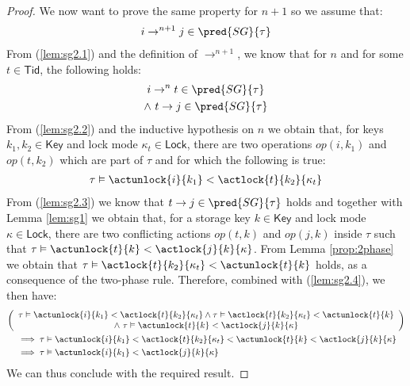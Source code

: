 \begin{lem}
{\begin{proof}
	We now want to prove the same property for $n + 1$ so we assume that:
	\begin{gather}
		\label{lem:sg2.1}
		i \rightarrow^{n+1} j \in \pred{SG}{\tau}
	\end{gather}
	From (\ref{lem:sg2.1}) and the definition of $\rightarrow^{n+1}$, we know that for $n$ and for some $t \in \mathsf{Tid}$, the following holds:
	\begin{gather}
		\label{lem:sg2.2}
		i \rightarrow^n t \in \pred{SG}{\tau} \\
		\label{lem:sg2.3}
		\land\ t \rightarrow j \in \pred{SG}{\tau}
	\end{gather}
	From (\ref{lem:sg2.2}) and the inductive hypothesis on $n$ we obtain that, for keys $k_1, k_2 \in \mathsf{Key}$ and lock mode $\kappa_t \in \mathsf{Lock}$, there are two operations $op(i, k_1)$ and $op(t, k_2)$ which are part of $\tau$ and for which the following is true:
	\begin{gather}
		\label{lem:sg2.4}
		\tau \vDash \actunlock{i}{k_1} < \actlock{t}{k_2}{\kappa_t}
	\end{gather}
	From (\ref{lem:sg2.3}) we know that $t \rightarrow j \in \pred{SG}{\tau}$ holds and together with Lemma \ref{lem:sg1} we obtain that, for a storage key $k \in \mathsf{Key}$ and lock mode $\kappa \in \mathsf{Lock}$, there are two conflicting actions $op(t, k)$ and $op(j, k)$ inside $\tau$ such that $\tau \vDash \actunlock{t}{k} < \actlock{j}{k}{\kappa}$. From Lemma \ref{prop:2phase} we obtain that $\tau \vDash \actlock{t}{k_2}{\kappa_t} < \actunlock{t}{k}$ holds, as a consequence of the two-phase rule. Therefore, combined with (\ref{lem:sg2.4}), we then have:
	\begin{gather*}
		\left(
		\begin{array}{c}
			\tau \vDash \actunlock{i}{k_1} < \actlock{t}{k_2}{\kappa_t}
			\land \tau \vDash \actlock{t}{k_2}{\kappa_t} < \actunlock{t}{k} \\
			\land\ \tau \vDash \actunlock{t}{k} < \actlock{j}{k}{\kappa}
		\end{array} \right) \\
		\begin{aligned}
			&\implies \tau \vDash \actunlock{i}{k_1} < \actlock{t}{k_2}{\kappa_t} < \actunlock{t}{k} < \actlock{j}{k}{\kappa} \\
			&\implies \tau \vDash \actunlock{i}{k_1} < \actlock{j}{k}{\kappa}
		\end{aligned}
	\end{gather*}
	We can thus conclude with the required result.
	\end{proof}
	}
\end{lem}

